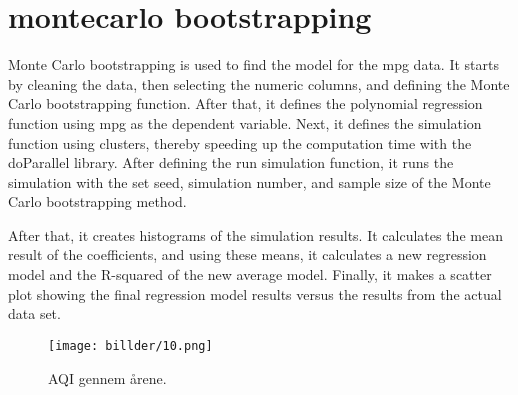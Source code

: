 

\section{montecarlo bootstrapping }

Monte Carlo bootstrapping is used to find the model for the mpg data. It starts by cleaning the data, then selecting the numeric columns, and defining the Monte Carlo bootstrapping function. After that, it defines the polynomial regression function using mpg as the dependent variable. Next, it defines the simulation function using clusters, thereby speeding up the computation time with the doParallel library. After defining the run simulation function, it runs the simulation with the set seed, simulation number, and sample size of the Monte Carlo bootstrapping method.

After that, it creates histograms of the simulation results. It calculates the mean result of the coefficients, and using these means, it calculates a new regression model and the R-squared of the new average model. Finally, it makes a scatter plot showing the final regression model results versus the results from the actual data set.


\begin{figure}[h] 
	\centering
	\texttt{[image: billder/10.png]}
	\caption{AQI gennem årene.}
	\label{fig:j06}
\end{figure}

